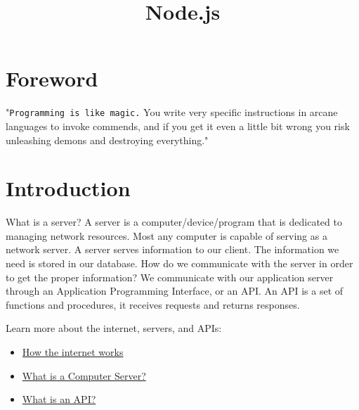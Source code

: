 \documentclass{42-en}
\begin{document}
\title{Node.js}
\maketitle

\tableofcontents


\chapter{Foreword}

"\texttt{Programming is like magic.} You write very specific instructions in arcane languages to invoke commends, and if you get it even a little bit wrong you risk unleashing demons and destroying everything."


\chapter{Introduction}

What is a server? A server is a computer/device/program that is dedicated to managing network resources. Most any computer is capable of serving as a network server. A server serves information to our client. The information we need is stored in our database. How do we communicate with the server in order to get the proper information? We communicate with our application server through an Application Programming Interface, or an API. An API is a set of functions and procedures, it receives requests and returns responses.

Learn more about the internet, servers, and APIs:
\begin{itemize}\itemsep1pt
\item \href{https://www.youtube.com/watch?v=ZhEf7e4kopM&list=PLzdnOPI1iJNfMRZm5DDxco3UdsFegvuB7&index=2}{How the internet works}
\item \href{https://www.youtube.com/watch?v=TQQA8RpKxqg}{What is a Computer Server?}
\item \href{https://www.youtube.com/watch?v=s7wmiS2mSXY}{What is an API?}
\end{itemize}
\end{document}
